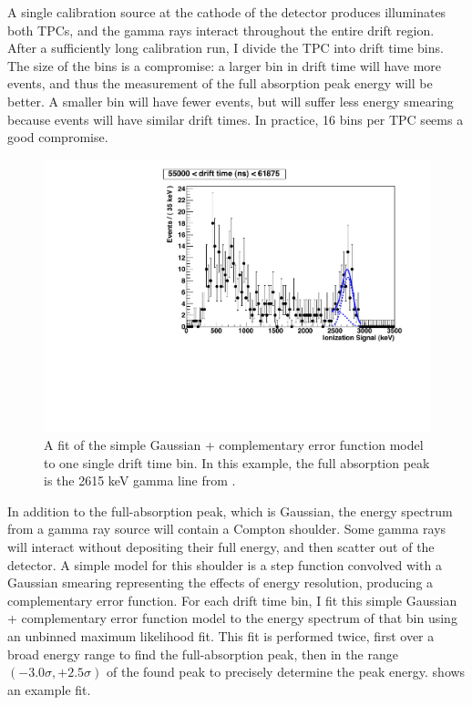 \documentclass[herrin-thesis.tex]{subfiles}
\begin{document}
A single calibration source at the cathode of the detector produces illuminates both TPCs, and the gamma rays interact throughout the entire drift region. After a sufficiently long calibration run, I divide the TPC into drift time bins. The size of the bins is a compromise: a larger bin in drift time will have more events, and thus the measurement of the full absorption peak energy will be better. A smaller bin will have fewer events, but will suffer less energy smearing because events will have similar drift times. In practice, 16 bins per TPC seems a good compromise.

\begin{figure}[htbp]
\centering
\includegraphics[width=0.6\columnwidth]{./plots/el_run4034_dt_bin_fit.pdf}
\caption[An example fit in a drift time bin]{A fit of the simple Gaussian + complementary error function model to one single drift time bin. In this example, the full absorption peak is the 2615 keV gamma line from .}
\label{fig:el_dtbinfit}
\end{figure}

In addition to the full-absorption peak, which is Gaussian, the energy spectrum from a gamma ray source will contain a Compton shoulder. Some gamma rays will interact without depositing their full energy, and then scatter out of the detector. A simple model for this shoulder is a step function convolved with a Gaussian smearing representing the effects of energy resolution, producing a complementary error function. For each drift time bin, I fit this simple Gaussian + complementary error function model to the energy spectrum of that bin using an unbinned maximum likelihood fit. This fit is performed twice, first over a broad energy range to find the full-absorption peak, then in the range \((-3.0\sigma, +2.5\sigma)\) of the found peak to precisely determine the peak energy.  shows an example fit.
\end{document}
